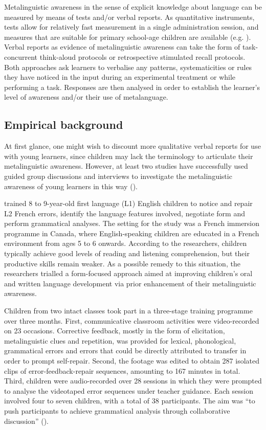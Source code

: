 \documentclass[output=paper]{langscibook}
\begin{document}
Metalinguistic awareness in the sense of explicit knowledge about language can be measured by means of tests and/or verbal reports. As quantitative instruments, tests allow for relatively fast measurement in a single administration session, and measures that are suitable for primary school-age children are available (e.g. \citealt{Hakes1980,PintoEtAl1999,Tellier2013}). Verbal reports as evidence of metalinguistic awareness can take the form of task-concurrent think-aloud protocols or retrospective stimulated recall protocols. Both approaches ask learners to verbalise any patterns, systematicities or rules they have noticed in the input during an experimental treatment or while performing a task. Responses are then analysed in order to establish the learner’s level of awareness and/or their use of metalanguage.

\subsection{Empirical background}

At first glance, one might wish to discount more qualitative verbal reports for use with young learners, since children may lack the terminology to articulate their metalinguistic awareness. However, at least two studies have successfully used guided group discussions and interviews to investigate the metalinguistic awareness of young learners in this way (\citealt{AmmarEtAl2010,BouffardSarkar2008}).

\citet{BouffardSarkar2008} trained 8 to 9-year-old first language (L1) English children to notice and repair L2 French errors, identify the language features involved, negotiate form and perform grammatical analyses. The setting for the study was a French immersion programme in Canada, where English-speaking children are educated in a French environment from ages 5 to 6 onwards. According to the researchers, children typically achieve good levels of reading and listening comprehension, but their productive skills remain weaker. As a possible remedy to this situation, the researchers trialled a form-focused approach aimed at improving children’s oral and written language development via prior enhancement of their metalinguistic awareness.

Children from two intact classes took part in a three-stage training programme over three months. First, communicative classroom activities were video-re\-cord\-ed on 23 occasions. Corrective feedback, mostly in the form of elicitation, metalinguistic clues and repetition, was provided for lexical, phonological, grammatical errors and errors that could be directly attributed to transfer in order to prompt self-repair. Second, the footage was edited to obtain 287 isolated clips of error-feedback-repair sequences, amounting to 167 minutes in total. Third, children were audio-recorded over 28 sessions in which they were prompted to analyse the videotaped error sequences under teacher guidance. Each session involved four to seven children, with a total of 38 participants. The aim was “to push participants to achieve grammatical analysis through collaborative discussion” (\citealt[8]{BouffardSarkar2008}).
\end{document}
